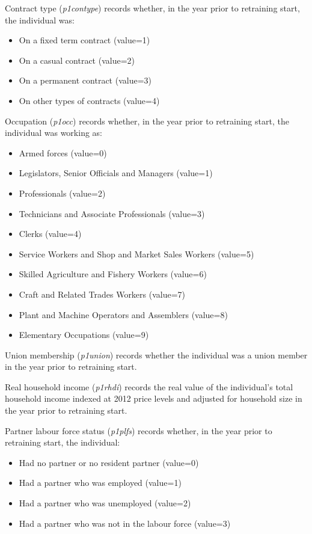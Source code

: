 \documentclass[12pt, a4paper]{article}
\begin{document}
Contract type (\textit{p1\textunderscore{}contype}) records whether, in the year prior to retraining start, the individual was:
\begin{itemize}
  \item On a fixed term contract (value=1)
  \item On a casual contract (value=2)
  \item On a permanent contract (value=3)
  \item On other types of contracts  (value=4)
\end{itemize}  

Occupation (\textit{p1\textunderscore{}occ}) records whether, in the year prior to retraining start, the individual was working as:
\begin{itemize}
  \item Armed forces (value=0)
  \item Legislators, Senior Officials and Managers (value=1)
  \item Professionals (value=2)
  \item Technicians and Associate Professionals (value=3)
  \item Clerks (value=4)
  \item Service Workers and Shop and Market Sales Workers (value=5)
  \item Skilled Agriculture and Fishery Workers (value=6)
  \item Craft and Related Trades Workers (value=7)
  \item Plant and Machine Operators and Assemblers (value=8)
  \item Elementary Occupations (value=9)
\end{itemize}  

Union membership (\textit{p1\textunderscore{}union}) records whether the individual was a union member in the year prior to retraining start.

Real household income (\textit{p1\textunderscore{}rhdi}) records the real value of the individual’s total household income indexed at 2012 price levels and adjusted for household size in the year prior to retraining start.

Partner labour force status (\textit{p1\textunderscore{}plfs}) records whether, in the year prior to retraining start, the individual:
\begin{itemize}
  \item Had no partner or no resident partner (value=0)
  \item Had a partner who was employed (value=1)
  \item Had a partner who was unemployed (value=2)
  \item Had a partner who was not in the labour force (value=3)
\end{itemize}  
\end{document}
